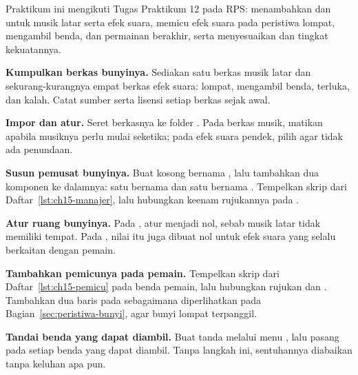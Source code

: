 \begin{praktikumbox}
Praktikum ini mengikuti Tugas Praktikum 12 pada RPS: menambahkan
 dan  untuk musik latar serta efek suara,
memicu efek suara pada peristiwa lompat, mengambil benda, dan permainan
berakhir, serta menyesuaikan  dan tingkat kekuatannya.

\begin{langkah}
  \item \textbf{Kumpulkan berkas bunyinya.} Sediakan satu berkas musik latar
        dan sekurang-kurangnya empat berkas efek suara: lompat, mengambil
        benda, terluka, dan kalah. Catat sumber serta lisensi setiap berkas
        sejak awal.

  \item \textbf{Impor dan atur.} Seret berkasnya ke folder . Pada
        berkas musik, matikan  apabila musiknya
        perlu mulai seketika; pada efek suara pendek, pilih
         agar tidak ada penundaan.

  \item \textbf{Susun pemusat bunyinya.} Buat  kosong
        bernama , lalu tambahkan dua komponen
         ke dalamnya: satu bernama  dan
        satu bernama . Tempelkan skrip
         dari Daftar~\ref{lst:ch15-manajer}, lalu
        hubungkan keenam rujukannya pada .

  \item \textbf{Atur ruang bunyinya.} Pada , atur
         menjadi nol, sebab musik latar tidak memiliki
        tempat. Pada , nilai itu juga dibuat nol untuk efek
        suara yang selalu berkaitan dengan pemain.

  \item \textbf{Tambahkan pemicunya pada pemain.} Tempelkan skrip
         dari Daftar~\ref{lst:ch15-pemicu} pada
        benda pemain, lalu hubungkan rujukan  dan .
        Tambahkan dua baris pada  sebagaimana
        diperlihatkan pada Bagian~\ref{sec:peristiwa-bunyi}, agar bunyi lompat
        terpanggil.

  \item \textbf{Tandai benda yang dapat diambil.} Buat tanda 
        melalui menu , lalu pasang pada setiap benda yang dapat
        diambil. Tanpa langkah ini, sentuhannya diabaikan tanpa keluhan apa
        pun.


\end{langkah}
\end{praktikumbox}

